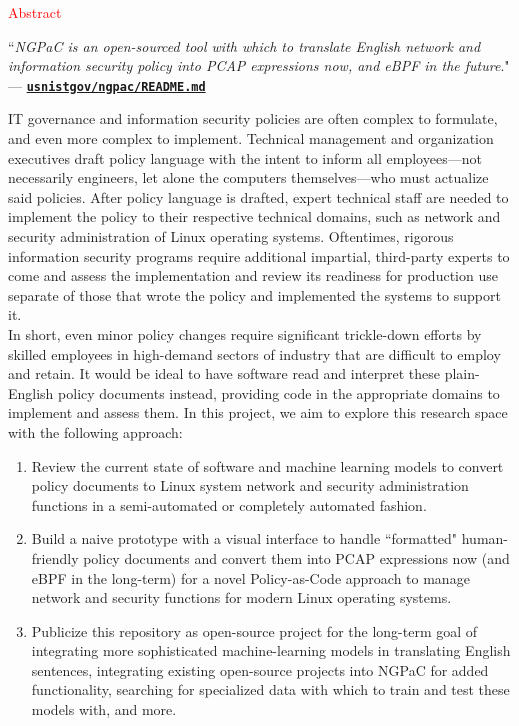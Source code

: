 \documentclass[11pt]{article}
\begin{document}
\begin{blackbox}{\begin{center}\LARGE\textcolor{red}{Abstract}\end{center}}
    \normalfont
    \begin{center}
        \large``\textit{NGPaC is an open-sourced tool with which to translate English network and information security policy into PCAP expressions now, and eBPF in the future}." \\
        --- \href{https://github.com/usnistgov/ngpac/tree/main}{\texttt{\textbf{usnistgov/ngpac/README.md}}}
    \end{center}
    
    \phantom{~~~~} IT governance and information security policies are often complex to formulate, and even more complex to implement. Technical management and organization executives draft policy language with the intent to inform all employees---not necessarily engineers, let alone the computers themselves---who must actualize said policies. After policy language is drafted, expert technical staff are needed to implement the policy to their respective technical domains, such as network and security administration of Linux operating systems. Oftentimes, rigorous information security programs require additional impartial, third-party experts to come and assess the implementation and review its readiness for production use separate of those that wrote the policy and implemented the systems to support it. \\

    \phantom{~~~~} In short, even minor policy changes require significant trickle-down efforts by skilled employees in high-demand sectors of industry that are difficult to employ and retain. It would be ideal to have software read and interpret these plain-English policy documents instead, providing code in the appropriate domains to implement and assess them. In this project, we aim to explore this research space with the following approach:

    \begin{enumerate}
        \item Review the current state of software and machine learning models to convert policy documents to Linux system network and security administration functions in a semi-automated or completely automated fashion.

        \item Build a naive prototype with a visual interface to handle ``formatted" human-friendly policy documents and convert them into PCAP expressions now (and eBPF in the long-term) for a novel Policy-as-Code approach to manage network and security functions for modern Linux operating systems.

        \item Publicize this repository as open-source project for the long-term goal of integrating more sophisticated machine-learning models in translating English sentences, integrating existing open-source projects into NGPaC for added functionality, searching for specialized data with which to train and test these models with, and more.
    \end{enumerate}
\end{blackbox}
\end{document}

